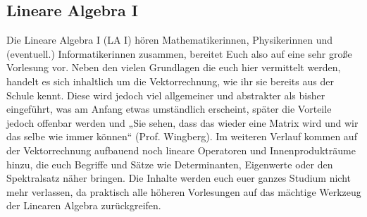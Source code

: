 \subsection{Lineare Algebra I}
\label{la1}
Die Lineare Algebra I (LA I) hören Mathematikerinnen, Physikerinnen und (eventuell.) Informatikerinnen zusammen, bereitet Euch also auf eine sehr große Vorlesung vor. Neben den vielen Grundlagen die euch hier vermittelt werden,  handelt es sich inhaltlich um die Vektorrechnung, wie ihr sie bereits aus der Schule kennt. Diese wird jedoch viel allgemeiner und abstrakter als bisher eingeführt, was am Anfang etwas umständlich erscheint, später die Vorteile jedoch offenbar werden und „Sie sehen, dass das wieder eine Matrix wird und wir das selbe wie immer können“ (Prof. Wingberg). Im weiteren Verlauf kommen auf der Vektorrechnung aufbauend noch lineare Operatoren und Innenprodukträume hinzu, die euch Begriffe und Sätze wie Determinanten, Eigenwerte oder den Spektralsatz näher bringen. Die Inhalte werden euch euer ganzes Studium nicht mehr verlassen, da praktisch alle höheren Vorlesungen auf das mächtige Werkzeug der Linearen Algebra zurückgreifen.
